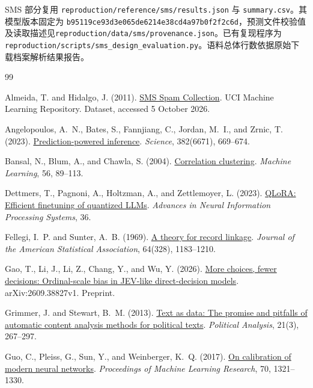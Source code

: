 \documentclass[UTF8,a4paper,zihao=-4,fontset=fandol]{ctexart}
\begin{document}
SMS 部分复用 \nolinkurl{reproduction/reference/sms/results.json} 与 \nolinkurl{summary.csv}。其模型版本固定为 \nolinkurl{b95119ce93d3e065de6214e38cd4a97b0f2f2c6d}，预测文件校验值及读取描述见\nolinkurl{reproduction/data/sms/provenance.json}。已有复现程序为 \nolinkurl{reproduction/scripts/sms_design_evaluation.py}。语料总体行数依据原始下载档案解析结果报告。
\begin{thebibliography}{99}
\small
{}

Almeida, T. and Hidalgo, J. (2011).
\href{https://doi.org/10.24432/C5CC84}{SMS Spam Collection}.
UCI Machine Learning Repository. Dataset, accessed 5 October 2026.

Angelopoulos, A.~N., Bates, S., Fannjiang, C., Jordan, M.~I., and Zrnic, T. (2023).
\href{https://doi.org/10.1126/science.adi6000}{Prediction-powered inference}.
\emph{Science}, 382(6671), 669--674.

Bansal, N., Blum, A., and Chawla, S. (2004).
\href{https://doi.org/10.1023/B:MACH.0000033116.57574.95}{Correlation clustering}.
\emph{Machine Learning}, 56, 89--113.

Dettmers, T., Pagnoni, A., Holtzman, A., and Zettlemoyer, L. (2023).
\href{https://proceedings.neurips.cc/paper_files/paper/2023/hash/1feb87871436031bdc0f2beaa62a049b-Abstract-Conference.html}{QLoRA: Efficient finetuning of quantized LLMs}.
\emph{Advances in Neural Information Processing Systems}, 36.

Fellegi, I.~P. and Sunter, A.~B. (1969).
\href{https://doi.org/10.1080/01621459.1969.10501049}{A theory for record linkage}.
\emph{Journal of the American Statistical Association}, 64(328), 1183--1210.

Gao, T., Li, J., Li, Z., Chang, Y., and Wu, Y. (2026).
\href{https://arxiv.org/abs/2609.38827v1}{More choices, fewer decisions: Ordinal-scale bias in JEV-like direct-decision models}.
arXiv:2609.38827v1. Preprint.

Grimmer, J. and Stewart, B.~M. (2013).
\href{https://doi.org/10.1093/pan/mps028}{Text as data: The promise and pitfalls of automatic content analysis methods for political texts}.
\emph{Political Analysis}, 21(3), 267--297.

Guo, C., Pleiss, G., Sun, Y., and Weinberger, K.~Q. (2017).
\href{https://proceedings.mlr.press/v70/guo17a.html}{On calibration of modern neural networks}.
\emph{Proceedings of Machine Learning Research}, 70, 1321--1330.


\end{thebibliography}
\end{document}
